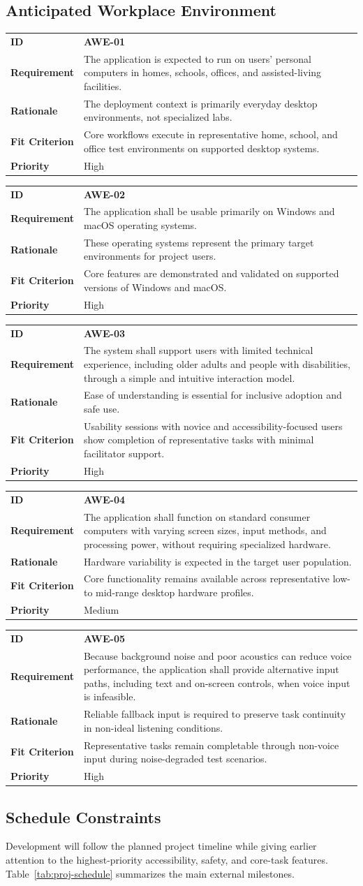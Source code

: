 \documentclass[12pt]{article}
\makeatletter
\newcommand{\reqcard}[5]{%
\noindent\begin{tabularx}{\textwidth}{@{}p{2.35cm}X@{}}
\textbf{ID} & \textbf{#1} \\
\textbf{Requirement} & #2 \\
\textbf{Rationale} & #3 \\
\textbf{Fit Criterion} & #4 \\
\textbf{Priority} & #5 \\
\end{tabularx}\par\medskip
}
\makeatother
\begin{document}
\subsection{Anticipated Workplace Environment}
\reqcard{AWE-01}{The application is expected to run on users' personal
computers in homes, schools, offices, and assisted-living
facilities.}{The deployment context is primarily everyday desktop
environments, not specialized labs.}{Core workflows execute in
representative home, school, and office test environments on supported
desktop systems.}{High}

\reqcard{AWE-02}{The application shall be usable primarily on Windows
and macOS operating systems.}{These operating systems represent the
primary target environments for project users.}{Core features are
demonstrated and validated on supported versions of Windows and
macOS.}{High}

\reqcard{AWE-03}{The system shall support users with limited technical
experience, including older adults and people with disabilities,
through a simple and intuitive interaction model.}{Ease of
understanding is essential for inclusive adoption and safe
use.}{Usability sessions with novice and accessibility-focused users
show completion of representative tasks with minimal facilitator
support.}{High}

\reqcard{AWE-04}{The application shall function on standard consumer
computers with varying screen sizes, input methods, and processing
power, without requiring specialized hardware.}{Hardware variability is
expected in the target user population.}{Core functionality remains
available across representative low- to mid-range desktop hardware
profiles.}{Medium}

\reqcard{AWE-05}{Because background noise and poor acoustics can reduce
voice performance, the application shall provide alternative input
paths, including text and on-screen controls, when voice input is
infeasible.}{Reliable fallback input is required to preserve task
continuity in non-ideal listening conditions.}{Representative tasks
remain completable through non-voice input during noise-degraded test
scenarios.}{High}

\subsection{Schedule Constraints}
Development will follow the planned project timeline while giving
earlier attention to the highest-priority accessibility, safety, and
core-task features. Table~\ref{tab:proj-schedule} summarizes the main
external milestones.
\end{document}
